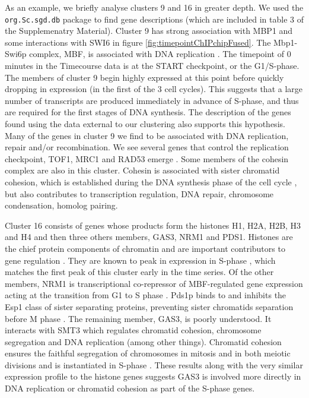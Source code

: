 \documentclass{bioinfo}
\begin{document}
As an example, we briefly analyse clusters 9 and 16 in greater depth. We used the \texttt{org.Sc.sgd.db} \citep{carlson2014org} package to find gene descriptions (which are included in table 3 of the Supplemenatry Material). Cluster 9 has strong association with MBP1 and some interactions with SWI6 in figure \ref{fig:timepointChIPchipFused}. The Mbp1-Swi6p complex, MBF, is associated with DNA replication \citep{iyer2001genomic}. The timepoint of 0 minutes in the Timecourse data is at the START checkpoint, or the G1/S-phase. The members of cluster 9 begin highly expressed at this point before quickly dropping in expression (in the first of the 3 cell cycles). This suggests that a large number of transcripts are produced immediately in advance of S-phase, and thus are required for the first stages of DNA synthesis. The description of the genes found using the data external to our clustering also supports this hypothesis. Many of the genes in cluster 9 we find to be associated with DNA replication, repair and/or recombination. We see several genes that control the replication checkpoint, TOF1, MRC1 and RAD53 emerge \citep{bando2009csm3, lao2018yeast}. Some members of the cohesin complex are also in this cluster. Cohesin is associated with sister chromatid cohesion, which is established during the DNA synthesis phase of the cell cycle \citep{toth1999yeast}, but also contributes to  transcription regulation, DNA repair, chromosome condensation, homolog pairing\citep{mehta2013cohesin}.

Cluster 16 consists of genes whose products form the histones H1, H2A, H2B, H3 and H4 and then three others members, GAS3, NRM1 and PDS1.  Histones are the chief protein components of chromatin \citep{fischle2003histone} and are important contributors to gene regulation \citep{bannister2011regulation}. They are known to peak in expression in S-phase \citep{granovskaia2010high}, which matches the first peak of this cluster early in the time series. Of the other members, NRM1 is transcriptional co-repressor of MBF-regulated gene expression acting at the transition from G1 to S phase \citep{de2006constraining, aligianni2009fission}. Pds1p binds to and inhibits the Esp1 class of sister separating proteins, preventing sister chromatids separation before M phase \citep{ciosk1998esp1, toth1999yeast}. The remaining member, GAS3, is poorly understood. It interacts with SMT3 which regulates chromatid cohesion, chromosome segregation and DNA replication (among other things). Chromatid cohesion ensures the faithful segregation of chromosomes in mitosis and in both meiotic divisions \citep{cooper2009pds1p} and is instantiated in S-phase \citep{toth1999yeast}. These results along with the very similar expression profile to the histone genes suggests GAS3 is involved more directly in DNA replication or chromatid cohesion as part of the S-phase genes.
\end{document}
